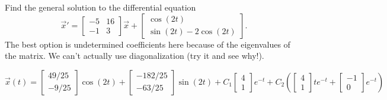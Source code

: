 \begin{exercise}
Find the general solution to the differential equation
\begin{equation*}
{\vec{x}}' = \begin{bmatrix} -5 & 16 \\ -1 & 3 \end{bmatrix} \vec{x} + \begin{bmatrix} \cos(2t) \\ \sin(2t) - 2\cos(2t) \end{bmatrix}. 
\end{equation*}
The best option is undetermined coefficients here because of the eigenvalues of the matrix. We can't actually use diagonalization (try it and see why!).
\end{exercise}
\comboSol{%
}
{%
$\vec{x}(t) = \left[\begin{smallmatrix} 49/25 \\ -9/25 \end{smallmatrix}\right]\cos(2t) + \left[\begin{smallmatrix} -182/25 \\ -63/25 \end{smallmatrix}\right]\sin(2t) + C_1\left[\begin{smallmatrix} 4 \\ 1 \end{smallmatrix}\right]e^{-t} + C_2\left(\left[\begin{smallmatrix} 4 \\ 1 \end{smallmatrix}\right]te^{-t} + \left[\begin{smallmatrix} -1 \\ 0 \end{smallmatrix}\right]e^{-t}\right)$
}

